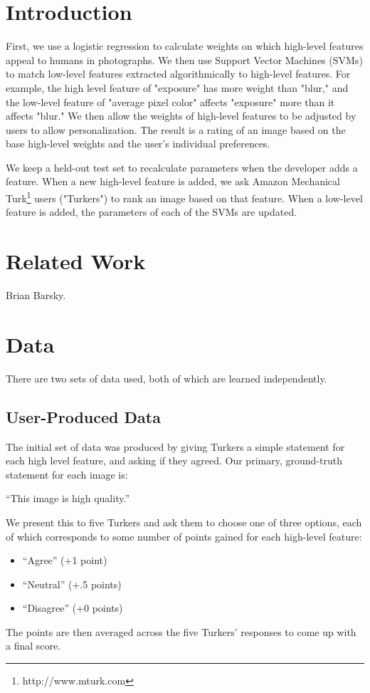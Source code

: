 \documentclass[10pt,twocolumn]{article}
\begin{document}
\section{Introduction}
First, we use a logistic regression to calculate weights on which high-level features appeal to humans in photographs. We then use Support Vector Machines (SVMs) to match low-level features extracted algorithmically to high-level features. For example, the high level feature of "exposure" has more weight than "blur," and the low-level feature of "average pixel color" affects "exposure" more than it affects "blur." We then allow the weights of high-level features to be adjusted by users to allow personalization. The result is a rating of an image based on the base high-level weights and the user's individual preferences.

We keep a held-out test set to recalculate parameters when the developer adds a feature. When a new high-level feature is added, we ask Amazon Mechanical Turk\footnote{http://www.mturk.com} users ("Turkers") to rank an image based on that feature. When a low-level feature is added, the parameters of each of the SVMs are updated.

\section{Related Work}
Brian Barsky.

\section{Data}

There are two sets of data used, both of which are learned independently.

\subsection{User-Produced Data}
The initial set of data was produced by giving Turkers a simple statement for each high level feature, and asking if they agreed. Our primary, ground-truth statement for each image is:

``This image is high quality.''

We present this to five Turkers and ask them to choose one of three options, each of which corresponds to some number of points gained for each high-level feature:

\begin{itemize}
\item ``Agree'' (+1 point)
\item ``Neutral'' (+.5 points)
\item ``Disagree'' (+0 points)
\end{itemize}
The points are then averaged across the five Turkers' responses to come up with a final score.
\end{document}
